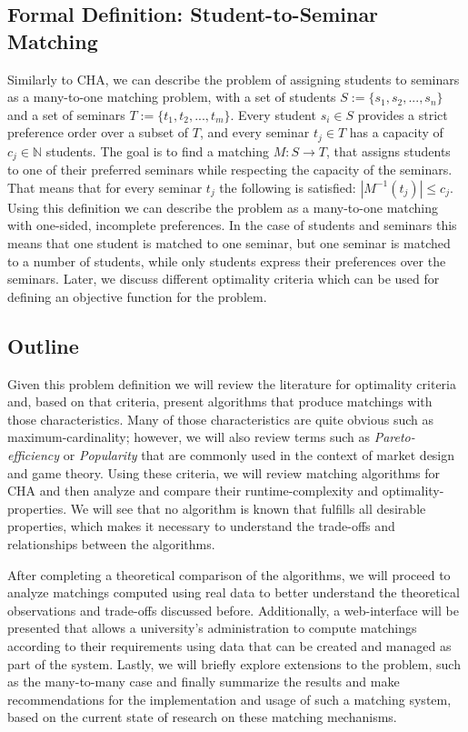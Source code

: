 \subsection{Formal Definition: Student-to-Seminar Matching}
Similarly to CHA, we can describe the problem of assigning students to seminars as a many-to-one matching problem, with a set of students $S:= \{s_1, s_2, ...,s_n\}$ and a set of seminars $T:= \{t_1, t_2, ..., t_m\}$. Every student $s_i \in S$ provides a strict preference order over a subset of $T$, and every seminar $t_j \in T$ has a capacity of $c_j \in \mathbb{N}$ students. The goal is to find a matching $M: S \rightarrow T$, that assigns students to one of their preferred seminars while respecting the capacity of the seminars. That means that for every seminar $t_j$ the following is satisfied: $|M^{-1}(t_j)| \leq c_j$. Using this definition we can describe the problem as a many-to-one matching with one-sided, incomplete preferences. In the case of students and seminars this means that one student is matched to one seminar, but one seminar is matched to a number of students, while only students express their preferences over the seminars. Later, we discuss different optimality criteria which can be used for defining an objective function for the problem.

\subsection{Outline}
Given this problem definition we will review the literature for optimality criteria and, based on that criteria, present algorithms that produce matchings with those characteristics. Many of those characteristics are quite obvious such as maximum-cardinality; however, we will also review terms such as \emph{Pareto-efficiency} or \emph{Popularity} that are commonly used in the context of market design and game theory. 
Using these criteria, we will review matching algorithms for CHA and then analyze and compare their runtime-complexity and optimality-properties. We will see that no algorithm is known that fulfills all desirable properties, which makes it necessary to understand the trade-offs and relationships between the algorithms. 

After completing a theoretical comparison of the algorithms, we will proceed to analyze matchings computed using real data to better understand the theoretical observations and trade-offs discussed before. Additionally, a web-interface will be presented that allows a university's administration to compute matchings according to their requirements using data that can be created and managed as part of the system. Lastly, we will briefly explore extensions to the problem, such as the many-to-many case and finally summarize the results and make recommendations for the implementation and usage of such a matching system, based on the current state of research on these matching mechanisms.

